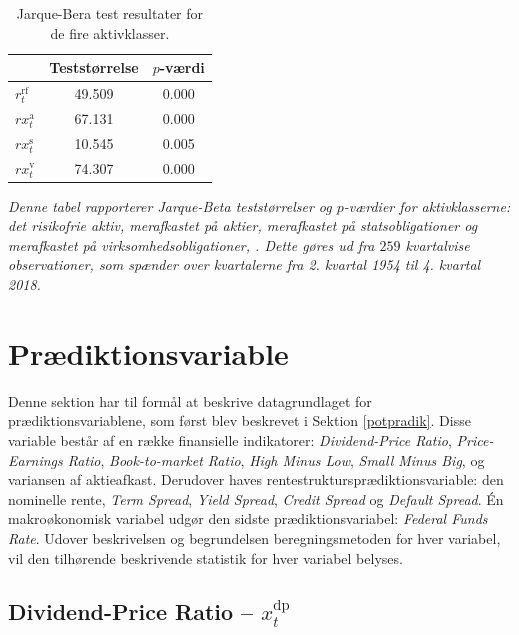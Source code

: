 \documentclass[
  a4paper,
  oneside]{memoir}
\begin{document}
\begin{table}[H]

\caption{\label{tab:JB-AKTIVKLASSE}Jarque-Bera test resultater for de fire aktivklasser.}
\centering
\begin{threeparttable}
\begin{tabular}[t]{lcc}
\toprule
  & Teststørrelse & $p$-værdi\\
\midrule
\rowcolor{gray!6}  $r_t^{\text{rf}}$ & 49.509 & 0.000\\
$rx_t^{\text{a}}$ & 67.131 & 0.000\\
\rowcolor{gray!6}  $rx_t^{\text{s}}$ & 10.545 & 0.005\\
$rx_t^{\text{v}}$ & 74.307 & 0.000\\
\bottomrule
\end{tabular}
\begin{tablenotes}
\item \textit{Denne tabel rapporterer Jarque-Beta teststørrelser og $p$-værdier for aktivklasserne: det risikofrie aktiv, merafkastet på aktier, merafkastet på statsobligationer og merafkastet på virksomhedsobligationer, \citep{Jarque1980}. Dette gøres ud fra $259$ kvartalvise observationer, som spænder over kvartalerne fra 2. kvartal 1954 til 4. kvartal 2018.}
\end{tablenotes}
\end{threeparttable}
\end{table}

\hypertarget{pvariable}{%
\section{Prædiktionsvariable}\label{pvariable}}

Denne sektion har til formål at beskrive datagrundlaget for prædiktionsvariablene, som først blev beskrevet i Sektion \ref{potpradik}. Disse variable består af en række finansielle indikatorer: \emph{Dividend-Price Ratio}, \emph{Price-Earnings Ratio}, \emph{Book-to-market Ratio}, \emph{High Minus Low}, \emph{Small Minus Big}, og variansen af aktieafkast. Derudover haves rentestruktursprædiktionsvariable: den nominelle rente, \emph{Term Spread}, \emph{Yield Spread}, \emph{Credit Spread} og \emph{Default Spread}. Én makroøkonomisk variabel udgør den sidste prædiktionsvariabel: \emph{Federal Funds Rate}. Udover beskrivelsen og begrundelsen beregningsmetoden for hver variabel, vil den tilhørende beskrivende statistik for hver variabel belyses.

\hypertarget{dividend-price-ratio-x_ttextdp}{%
\subsection{\texorpdfstring{Dividend-Price Ratio -- \(x_t^{\text{dp}}\)}{Dividend-Price Ratio -- x\_t\^{}\{\textbackslash text\{dp\}\}}}\label{dividend-price-ratio-x_ttextdp}}
\end{document}
